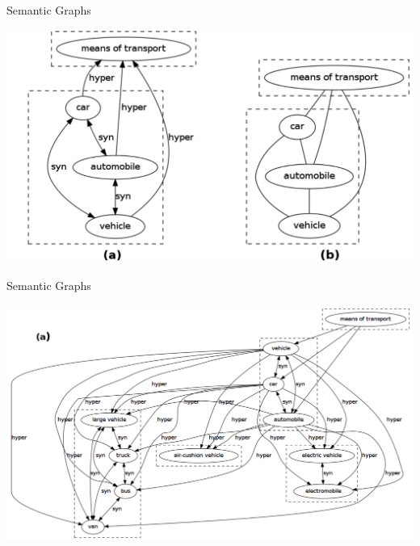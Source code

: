 \begin{frame}{Semantic Graphs}
	
	\begin{center}
  	\includegraphics[width=.99\textwidth]{figures/graph1}
  \end{center}	
\end{frame}




\begin{frame}{Semantic Graphs}
	
	\begin{center}
  	\includegraphics[width=.99\textwidth]{figures/graph2}
  \end{center}	
\end{frame}


